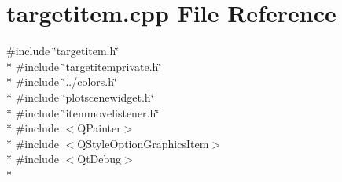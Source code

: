 \section{targetitem.\+cpp File Reference}
\label{bk3_2items_2targetitem_8cpp}
{\ttfamily \#include \char`\"{}targetitem.\+h\char`\"{}}\\*
{\ttfamily \#include \char`\"{}targetitemprivate.\+h\char`\"{}}\\*
{\ttfamily \#include \char`\"{}../colors.\+h\char`\"{}}\\*
{\ttfamily \#include \char`\"{}plotscenewidget.\+h\char`\"{}}\\*
{\ttfamily \#include \char`\"{}itemmovelistener.\+h\char`\"{}}\\*
{\ttfamily \#include $<$Q\+Painter$>$}\\*
{\ttfamily \#include $<$Q\+Style\+Option\+Graphics\+Item$>$}\\*
{\ttfamily \#include $<$Qt\+Debug$>$}\\*

